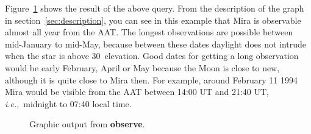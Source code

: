 Figure~\ref{fig_output} shows the result of the above query.
From the description of the graph in section~\ref{sec:description},
you can see in this example that Mira is observable almost all year
from the AAT.  The longest observations are possible between
mid-January to mid-May, because  between these dates daylight does not
intrude when the star is above 30\degrees\ elevation. Good dates for
getting a long observation would be early February, April or May
because the Moon is close to new, although it is quite close to Mira
then.  For example, around February 11 1994 Mira would be visible from
the AAT between 14:00 UT and 21:40 UT, {\em{i.e.}},~midnight to 07:40
local time.

\newpage

\begin{figure}
\begin{center}
\leavevmode\epsfysize=200mm
\vspace{5mm}
\caption{Graphic output from {\bf{observe}}.}
\label{fig_output}
\end{center}
\end{figure}


